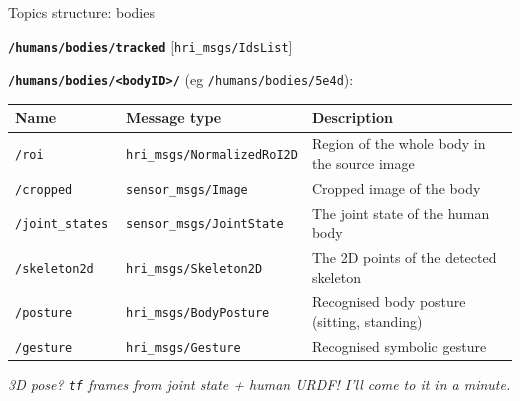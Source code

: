 \documentclass[xcolor=table,aspectratio=169]{beamer}
\begin{document}
\begin{frame}{Topics structure: bodies}

    \textbf{\texttt{/humans/bodies/tracked}}
    [\texttt{hri\_msgs/IdsList}]

    \vspace{1em}
    \textbf{\texttt{/humans/bodies/<bodyID>/}} (eg \texttt{/humans/bodies/5e4d}):

    \scriptsize
    \begin{tabular}{@{}p{2.5cm}p{4.5cm}p{6cm}@{}}
        \toprule
        \textbf{Name} & \textbf{Message type}         & \textbf{Description}                                                \\ \midrule
        \texttt{/roi       }   & \texttt{hri\_msgs/NormalizedRoI2D} & Region of the whole body in the source image                              \\
        \texttt{/cropped       }   & \texttt{sensor\_msgs/Image} & Cropped image of the body                              \\
        \texttt{/joint\_states       }   & \texttt{sensor\_msgs/JointState} & The joint state of the human body                              \\
        \texttt{/skeleton2d}   & \texttt{hri\_msgs/Skeleton2D}        & The 2D points of the detected skeleton                              \\
        \texttt{/posture}    & \texttt{hri\_msgs/BodyPosture}      & Recognised body posture (sitting, standing)                                 \\
        \texttt{/gesture}    & \texttt{hri\_msgs/Gesture}      & Recognised symbolic gesture                                 \\
        \bottomrule               
\end{tabular}

    \vspace{1em}
    \emph{3D pose? \texttt{tf} frames from joint state + human URDF! I'll come to it
    in a minute.}
    
\end{frame}
\end{document}
